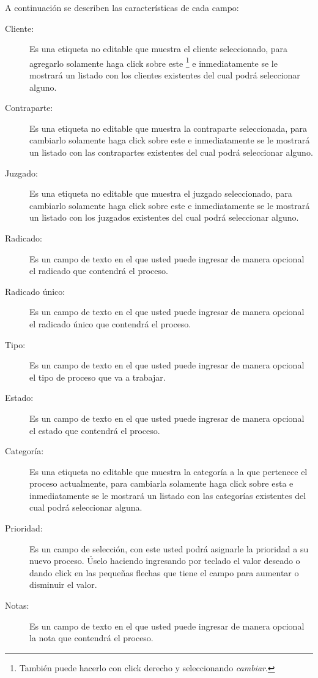  A continuaci\'on se describen las
caracter\'isticas de cada campo:
\begin{description}
\item[Cliente:]Es una etiqueta no editable que muestra el cliente
seleccionado, para agregarlo solamente haga click sobre este
\footnote{Tambi\'en puede hacerlo con click derecho y seleccionando \emph{cambiar}.}
e inmediatamente se
le mostrar\'a un listado con los clientes existentes del cual podr\'a
seleccionar alguno.
\item[Contraparte:]Es una etiqueta no editable que muestra la contraparte
seleccionada, para cambiarlo solamente haga click sobre este
\footnotemark[\value{footnote}]
e inmediatamente
se le mostrar\'a un listado con las contrapartes existentes del cual podr\'a
seleccionar alguno.
\item[Juzgado:]Es una etiqueta no editable que muestra el juzgado
seleccionado, para cambiarlo solamente haga click sobre este
\footnotemark[\value{footnote}]
e inmediatamente
se le mostrar\'a un listado con los juzgados existentes del cual podr\'a
seleccionar alguno.
\item[Radicado:]Es un campo de texto en el que usted puede ingresar de manera
opcional el radicado que contendr\'a el proceso.
\item[Radicado \'unico:]Es un campo de texto en el que usted puede ingresar de
manera opcional el radicado \'unico que contendr\'a el proceso.
\item[Tipo:]Es un campo de texto en el que usted puede ingresar de manera
opcional el tipo de proceso que va a trabajar.
\item[Estado:]Es un campo de texto en el que usted puede ingresar de manera
opcional el estado que contendr\'a el proceso.
\item[Categor\'ia:]Es una etiqueta no editable que muestra la categor\'ia
a la que pertenece el proceso actualmente, para cambiarla solamente haga click
sobre esta
\footnotemark[\value{footnote}]
e inmediatamente
se le mostrar\'a un listado con las categor\'ias existentes del cual podr\'a
seleccionar alguna.
\item[Prioridad:]Es un campo de selecci\'on, con este usted podr\'a asignarle
la prioridad a su nuevo proceso. \'Uselo haciendo ingresando por teclado el valor deseado o dando click en las peque\~nas flechas que tiene el campo para aumentar o disminuir el valor.
\item[Notas:]Es un campo de texto en el que usted puede ingresar de manera
opcional la nota que contendr\'a el proceso.
\end{description}

